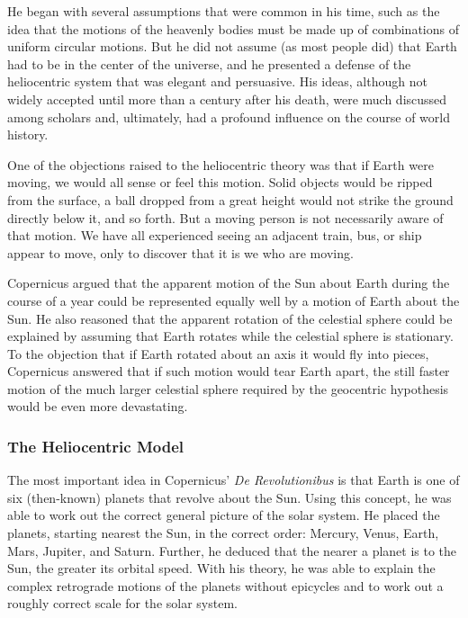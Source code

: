 \documentclass[../../main-astronomy.tex]{subfiles}
\begin{document}
\vspace{1em}

He began with several assumptions that were common in his time, such as the idea that the motions of the heavenly bodies must be made up of combinations of uniform circular motions. But he did not assume (as most people did) that Earth had to be in the center of the universe, and he presented a defense of the heliocentric system that was elegant and persuasive. His ideas, although not widely accepted until more than a century after his death, were much discussed among scholars and, ultimately, had a profound influence on the course of world history.

\vspace{1em}

One of the objections raised to the heliocentric theory was that if Earth were moving, we would all sense or feel this motion. Solid objects would be ripped from the surface, a ball dropped from a great height would not strike the ground directly below it, and so forth. But a moving person is not necessarily aware of that motion. We have all experienced seeing an adjacent train, bus, or ship appear to move, only to discover that it is we who are moving.

\vspace{1em}

Copernicus argued that the apparent motion of the Sun about Earth during the course of a year could be represented equally well by a motion of Earth about the Sun. He also reasoned that the apparent rotation of the celestial sphere could be explained by assuming that Earth rotates while the celestial sphere is stationary. To the objection that if Earth rotated about an axis it would fly into pieces, Copernicus answered that if such motion would tear Earth apart, the still faster motion of the much larger celestial sphere required by the geocentric hypothesis would be even more devastating.

\subsubsection*{The Heliocentric Model}

The most important idea in Copernicus' \textit{De Revolutionibus} is that Earth is one of six (then-known) planets that revolve about the Sun. Using this concept, he was able to work out the correct general picture of the solar system. He placed the planets, starting nearest the Sun, in the correct order: Mercury, Venus, Earth, Mars, Jupiter, and Saturn. Further, he deduced that the nearer a planet is to the Sun, the greater its orbital speed. With his theory, he was able to explain the complex retrograde motions of the planets without epicycles and to work out a roughly correct scale for the solar system.
\end{document}
